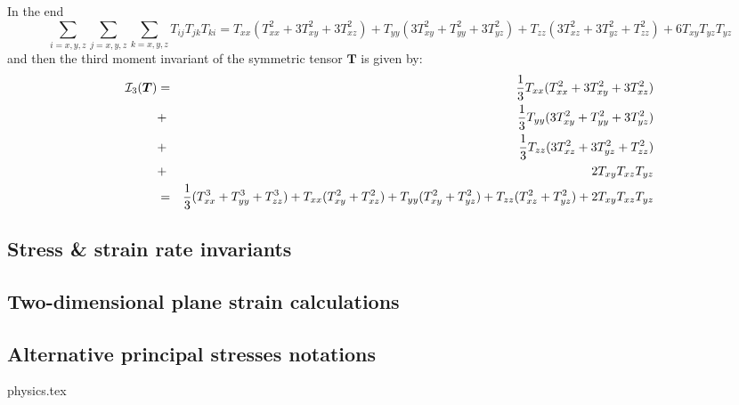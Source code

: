In the end 
\[
\sum_{i=x,y,z} \sum_{j=x,y,z} \sum_{k=x,y,z}
T_{ij}T_{jk}T_{ki}
= T_{xx}( T_{xx}^2 + 3T_{xy}^2 + 3T_{xz}^2)
+ T_{yy}(3T_{xy}^2 +  T_{yy}^2 + 3T_{yz}^2   )
+ T_{zz}(3T_{xz}^2 + 3T_{yz}^2 + T_{zz}^2  )
+6T_{xy}T_{yz}T_{yz}
\]
and then the third moment invariant of the symmetric tensor ${\bm T}$
is given by:
\begin{eqnarray}
{\cal I}_3({\bm T}) 
&=& \frac{1}{3} T_{xx} (  T_{xx}^2 + 3 T_{xy}^2 + 3 T_{xz}^2  )     \nonumber\\
&+& \frac{1}{3} T_{yy} (3 T_{xy}^2 +   T_{yy}^2 + 3 T_{yz}^2  )     \nonumber\\
&+& \frac{1}{3} T_{zz} (3 T_{xz}^2 + 3 T_{yz}^2 +   T_{zz}^2)       \nonumber\\
&+& 2 T_{xy} T_{xz} T_{yz} \\
&=& \frac{1}{3} (T_{xx}^3+T_{yy}^3+T_{zz}^3) 
+T_{xx} ( T_{xy}^2 +  T_{xz}^2  ) 
+T_{yy} ( T_{xy}^2 +  T_{yz}^2  ) 
+T_{zz} ( T_{xz}^2 +  T_{yz}^2  ) + 2 T_{xy} T_{xz} T_{yz} 
\end{eqnarray}




\subsection{Stress \& strain rate invariants}\label{sec:stress_invariants}



\subsection{Two-dimensional plane strain calculations} 











\subsection{Alternative principal stresses notations}\label{sec:altinv}
\begin{flushright} {\tiny {\color{gray} physics.tex}} \end{flushright}

